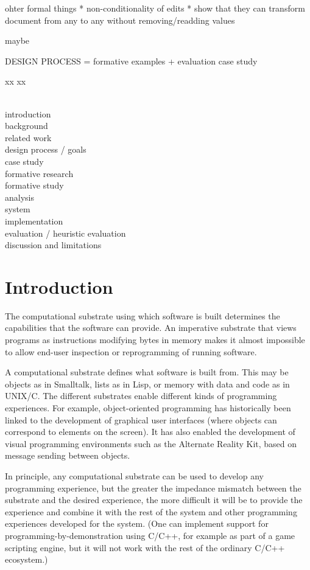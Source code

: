 \documentclass[sigconf]{acmart}
\begin{document}
ohter formal things
* non-conditionality of edits
* show that they can transform document from any to any without removing/readding values

maybe


DESIGN PROCESS = formative examples + evaluation case study

xx
\newpage
xx

~\\
introduction \\
background \\
related work \\
design process / goals \\
case study \\
formative research \\
formative study \\
analysis \\
system \\
implementation \\
evaluation / heuristic evaluation \\
discussion and limitations \\

\newpage

\section{Introduction}

The computational substrate using which software is built determines the capabilities that the
software can provide. An imperative substrate that views programs as instructions modifying
bytes in memory makes it almost impossible to allow end-user inspection or reprogramming of
running software.

A computational substrate defines what software is built from. This may be objects as in
Smalltalk, lists as in Lisp, or memory with data and code as in UNIX/C.
The different substrates enable different kinds of programming experiences.
For example, object-oriented programming has historically been linked to the development
of graphical user interfaces (where objects can correspond to elements on the screen).
It has also enabled the development of visual programming environments such as the Alternate
Reality Kit, based on message sending between objects.

In principle, any computational substrate can be used to develop any programming experience,
but the greater the impedance mismatch between the substrate and the desired experience,
the more difficult it will be to provide the experience and combine it with the rest of the
system and other programming experiences developed for the system. (One can implement support
for programming-by-demonstration using C/C++, for example as part of a game scripting engine,
but it will not work with the rest of the ordinary C/C++ ecosystem.)
\end{document}
